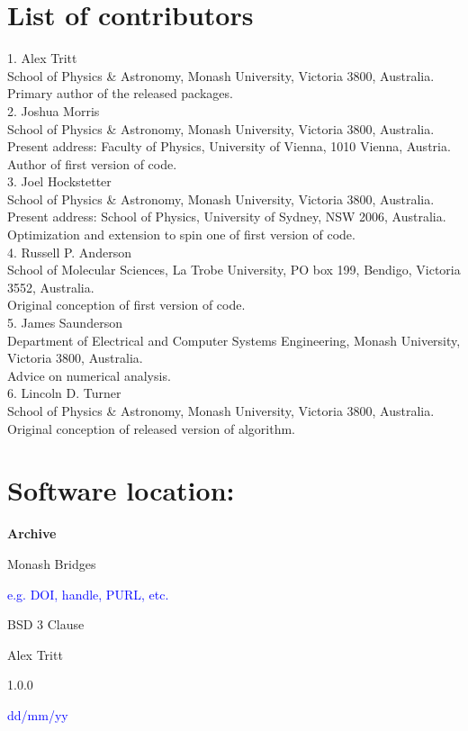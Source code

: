 \documentclass{jors}
\begin{document}
\section*{List of contributors}

1. Alex Tritt\\
	School of Physics \& Astronomy, Monash University, Victoria 3800, Australia.\\
	Primary author of the released packages.\\
2. Joshua Morris\\
	School of Physics \& Astronomy, Monash University, Victoria 3800, Australia.\\
	Present address: Faculty of Physics, University of Vienna, 1010 Vienna, Austria.\\
	Author of first version of code.\\
3. Joel Hockstetter\\
	School of Physics \& Astronomy, Monash University, Victoria 3800, Australia.\\
	Present address: School of Physics, University of Sydney, NSW 2006, Australia.\\
	Optimization and extension to spin one of first version of code.\\
4. Russell P. Anderson\\
	School of Molecular Sciences, La Trobe University, PO box 199, Bendigo, Victoria 3552, Australia.\\
	Original conception of first version of code.\\
5. James Saunderson\\
	Department of Electrical and Computer Systems Engineering, Monash University, Victoria 3800, Australia.\\
	Advice on numerical analysis.\\
6. Lincoln D. Turner\\
	School of Physics \& Astronomy, Monash University, Victoria 3800, Australia.\\
	Original conception of released version of algorithm.

\section*{Software location:}

{\bf Archive}

\begin{description}[noitemsep,topsep=0pt]
	\item[Name:] Monash Bridges
	\item[Persistent identifier:] \textcolor{blue}{e.g. DOI, handle, PURL, etc.}
	\item[Licence:] BSD 3 Clause
	\item[Publisher:]  Alex Tritt
	\item[Version published:] 1.0.0
	\item[Date published:] \textcolor{blue}{dd/mm/yy}
\end{description}
\end{document}
